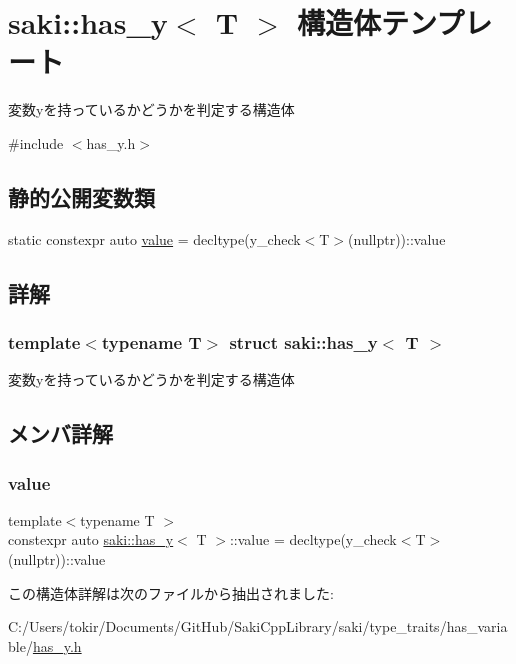 \hypertarget{structsaki_1_1has__y}{}\section{saki\+:\+:has\+\_\+y$<$ T $>$ 構造体テンプレート}
\label{structsaki_1_1has__y}


変数yを持っているかどうかを判定する構造体  




{\ttfamily \#include $<$has\+\_\+y.\+h$>$}

\subsection*{静的公開変数類}
\begin{DoxyCompactItemize}
\item 
static constexpr auto \mbox{\hyperlink{structsaki_1_1has__y_aa7f43916663394a6d3b07295be5cc1ee}{value}} = decltype(y\+\_\+check$<$T$>$(nullptr))\+::value
\end{DoxyCompactItemize}


\subsection{詳解}
\subsubsection*{template$<$typename T$>$\newline
struct saki\+::has\+\_\+y$<$ T $>$}

変数yを持っているかどうかを判定する構造体 

\subsection{メンバ詳解}
\mbox{\label{structsaki_1_1has__y_aa7f43916663394a6d3b07295be5cc1ee}} 
\subsubsection{\texorpdfstring{value}{value}}
{\footnotesize\ttfamily template$<$typename T $>$ \\
constexpr auto \mbox{\hyperlink{structsaki_1_1has__y}{saki\+::has\+\_\+y}}$<$ T $>$\+::value = decltype(y\+\_\+check$<$T$>$(nullptr))\+::value\hspace{0.3cm}{\ttfamily [static]}}



この構造体詳解は次のファイルから抽出されました\+:\begin{DoxyCompactItemize}
\item 
C\+:/\+Users/tokir/\+Documents/\+Git\+Hub/\+Saki\+Cpp\+Library/saki/type\+\_\+traits/has\+\_\+variable/\mbox{\hyperlink{has__y_8h}{has\+\_\+y.\+h}}\end{DoxyCompactItemize}

